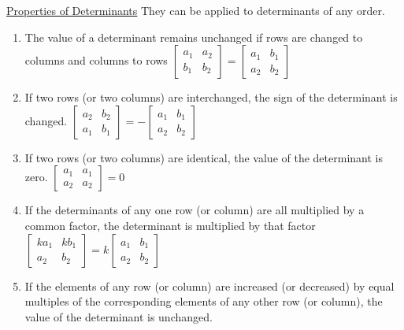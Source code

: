 \documentclass[12pt]{article}
\begin{document}
\begin{flushleft}
	\textbullet \quad \uline{Properties of Determinants} \linebreak 
	They can be applied to determinants of any order. 
	\begin{enumerate}
	\item The value of a determinant remains unchanged if rows are changed to columns and columns to rows \linebreak 
	$ 	\begin{bmatrix}
	a_1 & a_2 \\ 
	b_1 & b_2		
	\end{bmatrix} =
	\begin{bmatrix}
	a_1 & b_1 \\ 
	a_2 & b_2
	\end{bmatrix} $ \linebreak 
	\item If two rows (or two columns) are interchanged, the sign of the determinant is changed. \linebreak 
	$ \begin{bmatrix}
	a_2 & b_2 \\ 
	a_1 & b_1
	\end{bmatrix} = - 
	\begin{bmatrix}
	a_1 & b_1 \\ 
	a_2 & b_2
	\end{bmatrix} $ \linebreak 
	\item If two rows (or two columns) are identical, the value of the determinant is zero. \linebreak 
	$\begin{bmatrix}
	a_1 & a_1 \\ 
	a_2 & a_2
	\end{bmatrix} = 0 $ \linebreak 
	\item If the determinants of any one row (or column) are all multiplied by a common factor, the determinant is multiplied by that factor \linebreak 
	$ \begin{bmatrix}
	ka_1 & kb_1 \\ 
	a_2 & b_2
	\end{bmatrix} = k 
	\begin{bmatrix}
	a_1 & b_1 \\ 
	a_2 & b_2
	\end{bmatrix} $ \linebreak 
	\item If the elements of any row (or column) are increased (or decreased) by equal multiples of the corresponding elements of any other row (or column), the value of the determinant is unchanged. \linebreak 

\end{enumerate}
\end{flushleft}
\end{document}
